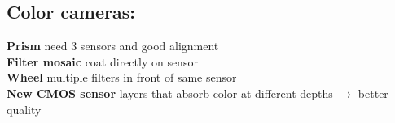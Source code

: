 \subsection*{Color cameras:}
\textbf{Prism} need 3 sensors and good alignment\\
\textbf{Filter mosaic} coat directly on sensor \\
\textbf{Wheel} multiple filters in front of same sensor\\
\textbf{New CMOS sensor} layers that absorb color at different depths $\rightarrow$ better quality
